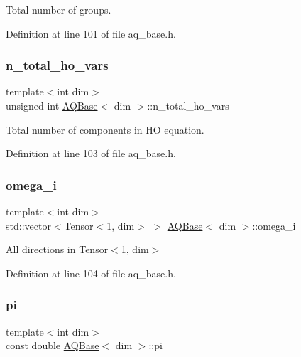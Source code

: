 Total number of groups. 



Definition at line 101 of file aq\+\_\+base.\+h.

\mbox{\label{class_a_q_base_a7169f8e3b53059317bb2144519f64be9}} 
\subsubsection{\texorpdfstring{n\+\_\+total\+\_\+ho\+\_\+vars}{n\_total\_ho\_vars}}
{\footnotesize\ttfamily template$<$int dim$>$ \\
unsigned int \hyperlink{class_a_q_base}{A\+Q\+Base}$<$ dim $>$\+::n\+\_\+total\+\_\+ho\+\_\+vars\hspace{0.3cm}{\ttfamily [protected]}}



Total number of components in HO equation. 



Definition at line 103 of file aq\+\_\+base.\+h.

\mbox{\label{class_a_q_base_a07aaf517b03be3f8405fd4063cf59231}} 
\subsubsection{\texorpdfstring{omega\+\_\+i}{omega\_i}}
{\footnotesize\ttfamily template$<$int dim$>$ \\
std\+::vector$<$Tensor$<$1, dim$>$ $>$ \hyperlink{class_a_q_base}{A\+Q\+Base}$<$ dim $>$\+::omega\+\_\+i\hspace{0.3cm}{\ttfamily [protected]}}



All directions in Tensor$<$1, dim$>$ 



Definition at line 104 of file aq\+\_\+base.\+h.

\mbox{\label{class_a_q_base_a002ce18f617db787616e60fba67899a9}} 
\subsubsection{\texorpdfstring{pi}{pi}}
{\footnotesize\ttfamily template$<$int dim$>$ \\
const double \hyperlink{class_a_q_base}{A\+Q\+Base}$<$ dim $>$\+::pi\hspace{0.3cm}{\ttfamily [protected]}}



